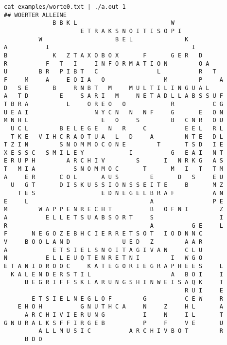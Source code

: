 \documentclass[a4paper,10pt,ngerman]{scrartcl}
\begin{document}
\begin{lstlisting}
cat examples/worte0.txt | ./a.out 1
## WOERTER ALLEINE
              B B K L                           W              
                      E T R A K S N O I T I S O P I            
          W                     B E L               K          
A           I                                         I        
B             K   Z T A X O B O X       F       G E R   D      
R           F   T   I     I N F O R M A T I O N         O A    
U         B R   P I B T   C                 L           R   T  
F     M     A     E O I A   O                 M         P     A
D   S E       B     R N B T   M     M U L T I L I N G U A L    
A   T D         E     S A R I   M     N E T A D L L A B S S U F
T B R A           L     O R E O   O             R           C G
U E A I                   N Y C N   N   N F     G       E   O N
M N H L                     E   O     S         B   C N R   O U
  U C L         B E L E G E   N   R     C           E E L   R L
  T K E   V I H C R A O T U A   L   D     A         N T E   D L
T Z I N         S N O M M O C O N E         T       T S D   I E
X E S S C   S M I L E Y             I           G   E A I   N T
E R U P H         A R C H I V         S       I   N R K G   A S
T   M I A           S N O M M O C       T       M   I   T   T M
A     E R       C O L       A U S         E       D   S     E U
  U   G T       D I S K U S S I O N S S E I T E     B       M Z
    T E S                   E D N E G E L B R A F           A N
E     L                                   A                 P E
M         W A P P E N R E C H T           B   O F N I         Z
A           E L L E T S U A B S O R T     S                   I
R                                         A           G E     L
F       N E G O Z E B H C I E R R E T S O T   I O D N N C      
V     B O O L A N D               U E D   Z         A A R      
A             E T S I E L S N O I T A G I V A N     C L U      
N           E L L E U Q T E N R E T N I         I   W G O      
E T A N I D R O O C     K A T E G O R I E G R A P H E E S     L
  K A L E N D E R S T I L                       A   B O I     I
      B E G R I F F S K L A R U N G S H I N W E I S A Q K     T
                                                    R U I     E
        E T S I E L N E G L O F         G           C E W     R
    E H O H           G N U T H C A     N     Z     H L       A
      A R C H I V I E R U N G           I     N     I L       T
G N U R A L K S F F I R G E B           P     F     V E       U
          A L L M U S I C           A R C H I V B O T         R
      B D D                                                    


\end{lstlisting}
\end{document}

